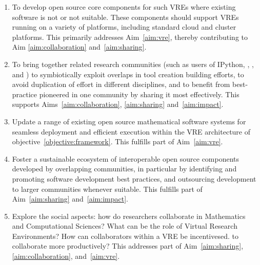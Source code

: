 \documentclass[noworkareas,deliverables,\classoptions]{euproposal}       %
\begin{document}
\begin{proposal}
\begin{enumerate}
\item\label{objectives:core} To develop open source core components
  for such VREs where existing software is not  or not suitable. These
  components should support VREs running on a variety of
  platforms, including standard cloud and cluster platforms. This primarily
  addresses Aim~\ref{aim:vre}, thereby contributing to Aim
  \ref{aim:collaboration} and~\ref{aim:sharing}.

\item \label{objective:community} To bring together related research
  communities (such as users of IPython, \Sage, \Singular, and \GAP)
  to symbiotically exploit overlaps in tool creation building efforts,
  to avoid duplication of effort in different disciplines, and to
  benefit from best-practice pioneered in one community by sharing it
  most effectively. This supports Aims~\ref{aim:collaboration},
  \ref{aim:sharing} and~\ref{aim:impact}.

\item \label{objective:updates} Update a range of existing open source
  mathematical software systems for seamless deployment and efficient
  execution within the VRE architecture of objective~\ref{objective:framework}.
  This fulfills part of Aim~\ref{aim:vre}.



\item \label{objective:sustainable} Foster a sustainable ecosystem of
  interoperable open source components developed by overlapping
  communities, in particular by identifying and promoting software
  development best practices, and outsourcing development to larger
  communities whenever suitable. This fulfills part of
  Aim~\ref{aim:sharing} and~\ref{aim:impact}.

\item \label{objective:social} Explore the social aspects: how do
  researchers collaborate in Mathematics and Computational Sciences? What can be the role of
  Virtual Research Environments?  How can collaborators within a VRE be incentivesed.
  to collaborate more productively? This addresses part of
  Aim~\ref{aim:sharing}, \ref{aim:collaboration},  and~\ref{aim:vre}.


\end{enumerate}
\end{proposal}
\end{document}

